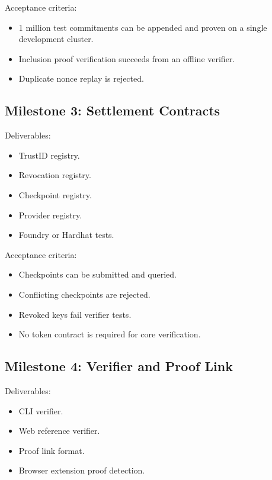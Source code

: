 \documentclass[11pt]{article}
\begin{document}
Acceptance criteria:

\begin{itemize}
    \item 1 million test commitments can be appended and proven on a single development cluster.
    \item Inclusion proof verification succeeds from an offline verifier.
    \item Duplicate nonce replay is rejected.
\end{itemize}

\subsection{Milestone 3: Settlement Contracts}

Deliverables:

\begin{itemize}
    \item TrustID registry.
    \item Revocation registry.
    \item Checkpoint registry.
    \item Provider registry.
    \item Foundry or Hardhat tests.
\end{itemize}

Acceptance criteria:

\begin{itemize}
    \item Checkpoints can be submitted and queried.
    \item Conflicting checkpoints are rejected.
    \item Revoked keys fail verifier tests.
    \item No token contract is required for core verification.
\end{itemize}

\subsection{Milestone 4: Verifier and Proof Link}

Deliverables:

\begin{itemize}
    \item CLI verifier.
    \item Web reference verifier.
    \item Proof link format.
    \item Browser extension proof detection.
\end{itemize}
\end{document}
